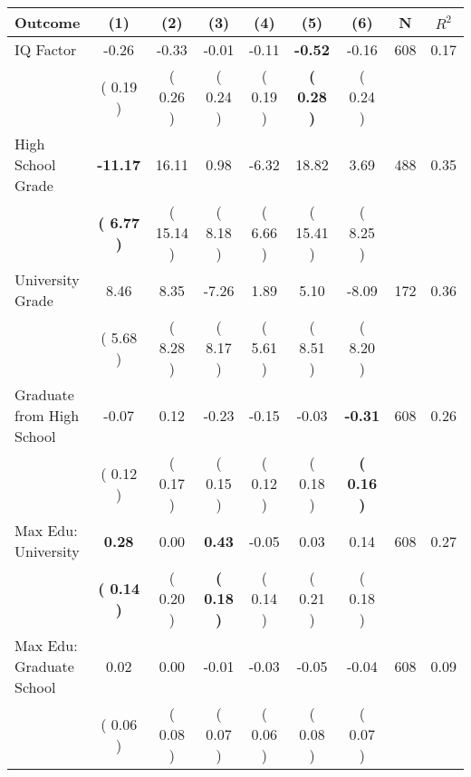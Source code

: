 \begin{tabular}{lcccccccc}
\toprule
 \textbf{Outcome} & \textbf{(1)} & \textbf{(2)} & \textbf{(3)} & \textbf{(4)} & \textbf{(5)} & \textbf{(6)} & \textbf{N} & \textbf{$ R^2$} \\
\midrule
IQ Factor &     -0.26 &     -0.33 &     -0.01 &     -0.11 & \textbf{    -0.52} &     -0.16 & 608 &       0.17 \\ 
 & (     0.19 ) & (     0.26 ) & (     0.24 ) & (     0.19 ) & \textbf{(     0.28 )} & (     0.24 ) & \\
High School Grade & \textbf{   -11.17} &     16.11 &      0.98 &     -6.32 &     18.82 &      3.69 & 488 &       0.35 \\ 
 & \textbf{(     6.77 )} & (    15.14 ) & (     8.18 ) & (     6.66 ) & (    15.41 ) & (     8.25 ) & \\
University Grade &      8.46 &      8.35 &     -7.26 &      1.89 &      5.10 &     -8.09 & 172 &       0.36 \\ 
 & (     5.68 ) & (     8.28 ) & (     8.17 ) & (     5.61 ) & (     8.51 ) & (     8.20 ) & \\
Graduate from High School &     -0.07 &      0.12 &     -0.23 &     -0.15 &     -0.03 & \textbf{    -0.31} & 608 &       0.26 \\ 
 & (     0.12 ) & (     0.17 ) & (     0.15 ) & (     0.12 ) & (     0.18 ) & \textbf{(     0.16 )} & \\
Max Edu: University & \textbf{     0.28} &      0.00 & \textbf{     0.43} &     -0.05 &      0.03 &      0.14 & 608 &       0.27 \\ 
 & \textbf{(     0.14 )} & (     0.20 ) & \textbf{(     0.18 )} & (     0.14 ) & (     0.21 ) & (     0.18 ) & \\
Max Edu: Graduate School &      0.02 &      0.00 &     -0.01 &     -0.03 &     -0.05 &     -0.04 & 608 &       0.09 \\ 
 & (     0.06 ) & (     0.08 ) & (     0.07 ) & (     0.06 ) & (     0.08 ) & (     0.07 ) & \\
\bottomrule
\end{tabular}
